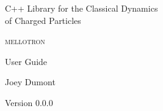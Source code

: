 \documentclass[10pt,letterpaper,extrafontsizes, onecolumn,openright]{memoir}
\begin{document}
\frontmatter
\pagestyle{empty}

\begin{vplace}
\begin{center}
\LARGE\textsf{C++ Library for the Classical Dynamics  \\ of Charged Particles}\par
\end{center}
\begin{center}
\HUGE\textsf{\textsc{mellotron}}\par
\end{center}


\begin{center}
\Huge\textsf{User Guide}\par
\end{center}
\begin{center}
\LARGE\textsf{Joey Dumont}\par
\bigskip
\normalsize\textsf{Version 0.0.0}\par
\end{center}
\end{vplace}
\cleardoublepage

\begin{abstract}

\end{abstract}

\cleardoublepage

\tableofcontents*
\clearpage

\mainmatter
\pagestyle{standard}

\end{document}
